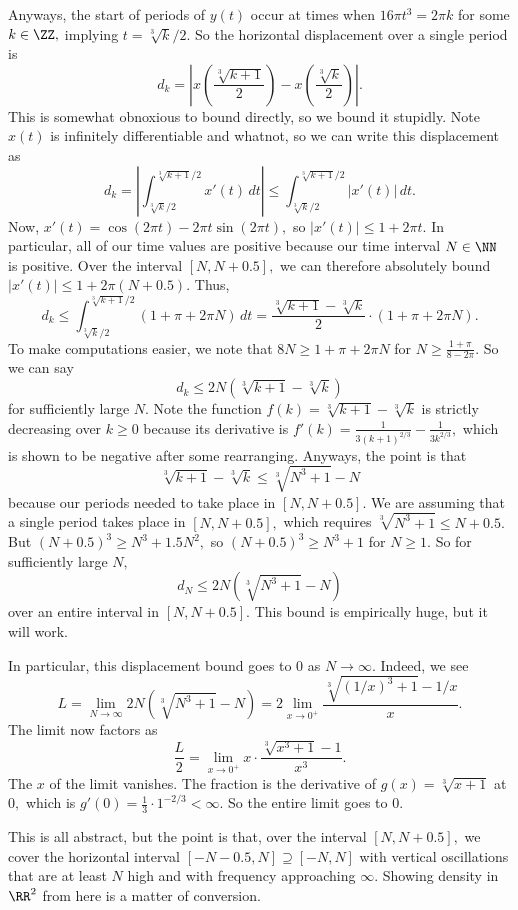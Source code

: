 Anyways, the start of periods of $y(t)$ occur at times when $16\pi t^3=2\pi k$ for some $k\in\ZZ,$ implying $t=\sqrt[3]k/2.$ So the horizontal displacement over a single period is
\[d_k=\left|x\left(\frac{\sqrt[3]{k+1}}2\right)-x\left(\frac{\sqrt[3]k}2\right)\right|.\]
This is somewhat obnoxious to bound directly, so we bound it stupidly. Note $x(t)$ is infinitely differentiable and whatnot, so we can write this displacement as
\[d_k=\left|\int_{\sqrt[3]k/2}^{\sqrt[3]{k+1}/2}x'(t)\,dt\right|\le\int_{\sqrt[3]k/2}^{\sqrt[3]{k+1}/2}|x'(t)|\,dt.\]
Now, $x'(t)=\cos(2\pi t)-2\pi t\sin(2\pi t),$ so $|x'(t)|\le1+2\pi t.$ In particular, all of our time values are positive because our time interval $N\in\NN$ is positive. Over the interval $[N,N+0.5],$ we can therefore absolutely bound $|x'(t)|\le1+2\pi(N+0.5).$ Thus,
\[d_k\le\int_{\sqrt[3]k/2}^{\sqrt[3]{k+1}/2}(1+\pi+2\pi N)\,dt=\frac{\sqrt[3]{k+1}-\sqrt[3]k}2\cdot(1+\pi+2\pi N).\]
To make computations easier, we note that $8N\ge1+\pi+2\pi N$ for $N\ge\frac{1+\pi}{8-2\pi}.$ So we can say
\[d_k\le2N\left(\sqrt[3]{k+1}-\sqrt[3]k\right)\]
for sufficiently large $N.$ Note the function $f(k)=\sqrt[3]{k+1}-\sqrt[3]k$ is strictly decreasing over $k\ge0$ because its derivative is $f'(k)=\frac1{3(k+1)^{2/3}}-\frac1{3k^{2/3}},$ which is shown to be negative after some rearranging. Anyways, the point is that
\[\sqrt[3]{k+1}-\sqrt[3]k\le\sqrt[3]{N^3+1}-N\]
because our periods needed to take place in $[N,N+0.5].$ We are assuming that a single period takes place in $[N,N+0.5],$ which requires $\sqrt[3]{N^3+1}\le N+0.5.$ But $(N+0.5)^3\ge N^3+1.5N^2,$ so $(N+0.5)^3\ge N^3+1$ for $N\ge1.$ So for sufficiently large $N,$
\[d_N\le2N\left(\sqrt[3]{N^3+1}-N\right)\]
over an entire interval in $[N,N+0.5].$ This bound is empirically huge, but it will work.

In particular, this displacement bound goes to $0$ as $N\to\infty.$ Indeed, we see
\[L=\lim_{N\to\infty}2N\left(\sqrt[3]{N^3+1}-N\right)=2\lim_{x\to0^+}\frac{\sqrt[3]{(1/x)^3+1}-1/x}x.\]
The limit now factors as
\[\frac L2=\lim_{x\to0^+}x\cdot\frac{\sqrt[3]{x^3+1}-1}{x^3}.\]
The $x$ of the limit vanishes. The fraction is the derivative of $g(x)=\sqrt[3]{x+1}$ at $0,$ which is $g'(0)=\frac13\cdot1^{-2/3}<\infty.$ So the entire limit goes to $0.$

This is all abstract, but the point is that, over the interval $[N,N+0.5],$ we cover the horizontal interval $[-N-0.5,N]\supseteq[-N,N]$ with vertical oscillations that are at least $N$ high and with frequency approaching $\infty.$ Showing density in $\RR^2$ from here is a matter of conversion.

